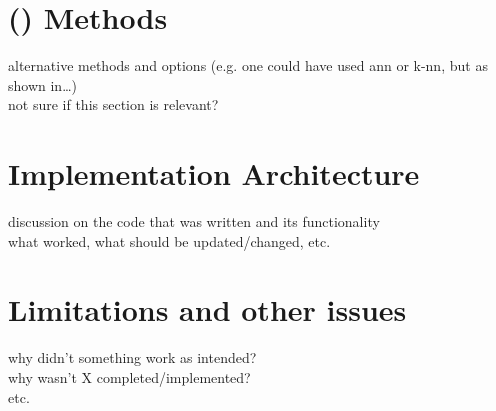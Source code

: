 \section[Artificial Intelligence Methods]{ () Methods}
\label{sec:ai_methods}
alternative methods and options (e.g. one could have used ann or k-nn, but as shown in\ldots) \\
not sure if this section is relevant?

\section{Implementation Architecture}
\label{sec:implemented_architecture}
discussion on the code that was written and its functionality \\
what worked, what should be updated/changed, etc.

\section{Limitations and other issues}
\label{sec:limitations_and_issues}
why didn't something work as intended? \\
why wasn't X completed/implemented? \\
etc.
